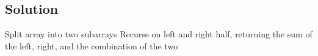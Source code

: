 \subsection*{Solution}

Split array into two subarrays
Recurse on left and right half, returning the sum of the left, right, and the combination of the two
